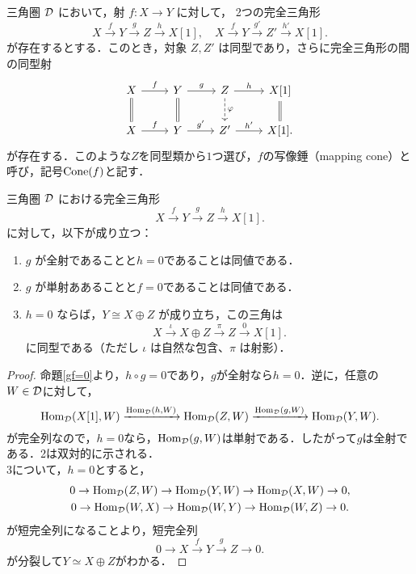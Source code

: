 \begin{cor}\cite[p.246]{KS06}
三角圏 ${\mathcal D}$ において，射 $f \colon X \to Y$ に対して，
2つの完全三角形
\[
X \xrightarrow{f} Y \xrightarrow{g} Z \xrightarrow{h} X[1], \quad
X \xrightarrow{f} Y \xrightarrow{g'} Z' \xrightarrow{h'} X[1].
\]
が存在するとする．このとき，対象 $Z, Z'$ は同型であり，さらに完全三角形の間の同型射
\[
\begin{tikzcd}
X \arrow{r}{f} \arrow[equal]{d} & Y \arrow{r}{g} \arrow[equal]{d} & Z \arrow{r}{h} \arrow[dashed]{d}{\varphi} & X[1] \arrow[equal]{d} \\
X \arrow{r}{f} & Y \arrow{r}{g'} & Z' \arrow{r}{h'} & X[1].
\end{tikzcd}
\]
が存在する．このような$Z$を同型類から$1$つ選び，$f$の写像錘（mapping cone）と呼び，記号$\operatorname{\mathrm{Cone}}(f)$と記す．
\end{cor}

\begin{cor}
三角圏 ${\mathcal D}$ における完全三角形
\[
X \xrightarrow{f} Y \xrightarrow{g} Z \xrightarrow{h} X[1].
\]
に対して，以下が成り立つ：

\begin{enumerate}
  \item $g$ が全射であることと$h = 0$であることは同値である．
  \item $g$ が単射ああることと$f = 0$であることは同値である．
  \item $h = 0$ ならば，$Y \cong X \oplus Z$ が成り立ち，この三角は
  \[
  X \xrightarrow{\iota} X \oplus Z \xrightarrow{\pi} Z \xrightarrow{0} X[1].
  \]
  に同型である（ただし $\iota$ は自然な包含、$\pi$ は射影）．
\end{enumerate}
\end{cor}
\begin{proof}
	命題\ref{gf=0}より，$h\circ g = 0$であり，$g$が全射なら$h=0$．逆に，任意の$W\in{\mathcal D}$に対して，
\[
	\operatorname{\mathrm{Hom}}_{{\mathcal D}}(X[1],W)\xrightarrow{\operatorname{\mathrm{Hom}}_{{\mathcal D}}(h,W)}\operatorname{\mathrm{Hom}}_{{\mathcal D}}(Z,W)\xrightarrow{\operatorname{\mathrm{Hom}}_{{\mathcal D}}(g,W)}\operatorname{\mathrm{Hom}}_{{\mathcal D}}(Y,W).
\]	
が完全列なので，$h=0$なら，$\operatorname{\mathrm{Hom}}_{{\mathcal D}}(g,W)$は単射である．したがって$g$は全射である．2は双対的に示される．\\
3について，$h=0$とすると，
\begin{gather*}
	0\rightarrow\operatorname{\mathrm{Hom}}_{{\mathcal D}}(Z,W)\rightarrow\operatorname{\mathrm{Hom}}_{{\mathcal D}}(Y,W)\rightarrow\operatorname{\mathrm{Hom}}_{{\mathcal D}}(X,W)\rightarrow 0,\\
	0\rightarrow\operatorname{\mathrm{Hom}}_{{\mathcal D}}(W,X)\rightarrow\operatorname{\mathrm{Hom}}_{{\mathcal D}}(W,Y)\rightarrow\operatorname{\mathrm{Hom}}_{{\mathcal D}}(W,Z)\rightarrow 0.
\end{gather*}
が短完全列になることより，短完全列
\[
0\rightarrow X \xrightarrow{f} Y \xrightarrow{g} Z\rightarrow 0 .
\]
が分裂して$Y\simeq X\oplus Z$がわかる．
\end{proof}

